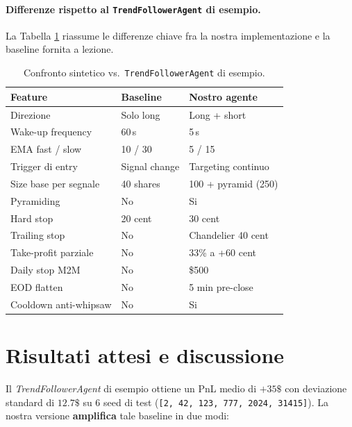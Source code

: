 \documentclass[11pt,a4paper]{article}
\begin{document}
\paragraph{Differenze rispetto al \texttt{TrendFollowerAgent} di
esempio.}
La Tabella \ref{tab:diff} riassume le differenze chiave fra la nostra
implementazione e la baseline fornita a lezione.

\begin{table}[h]
\centering
\caption{Confronto sintetico vs.\ \texttt{TrendFollowerAgent} di esempio.}
\label{tab:diff}
\begin{tabular}{lll}
\toprule
\textbf{Feature} & \textbf{Baseline} & \textbf{Nostro agente} \\
\midrule
Direzione               & Solo long          & Long + short \\
Wake-up frequency       & 60\,s              & 5\,s \\
EMA fast / slow         & 10 / 30            & 5 / 15 \\
Trigger di entry        & Signal change      & Targeting continuo \\
Size base per segnale   & 40 shares          & 100 + pyramid (250) \\
Pyramiding              & No                 & Si \\
Hard stop               & 20 cent            & 30 cent \\
Trailing stop           & No                 & Chandelier 40 cent \\
Take-profit parziale    & No                 & 33\% a +60 cent \\
Daily stop M2M          & No                 & \$500 \\
EOD flatten             & No                 & 5 min pre-close \\
Cooldown anti-whipsaw   & No                 & Si \\
\bottomrule
\end{tabular}
\end{table}

\section{Risultati attesi e discussione}
\label{sec:results}

Il \emph{TrendFollowerAgent} di esempio ottiene un PnL medio di
$+35\$$ con deviazione standard di $12.7\$$ su 6 seed di test
(\texttt{[2, 42, 123, 777, 2024, 31415]}).  La nostra versione
\textbf{amplifica} tale baseline in due modi:
\end{document}
